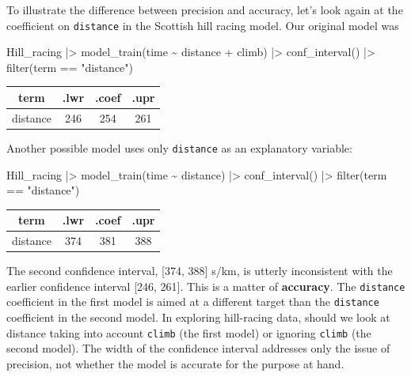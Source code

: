 \documentclass[
  letterpaper,
  DIV=11,
  numbers=noendperiod,
  oneside]{scrartcl}
\newenvironment{Shaded}{\begin{snugshade}}{\end{snugshade}}
\newcommand{\FunctionTok}[1]{\textcolor[rgb]{0.28,0.35,0.67}{#1}}
\newcommand{\NormalTok}[1]{\textcolor[rgb]{0.00,0.23,0.31}{#1}}
\newcommand{\SpecialCharTok}[1]{\textcolor[rgb]{0.37,0.37,0.37}{#1}}
\newcommand{\StringTok}[1]{\textcolor[rgb]{0.13,0.47,0.30}{#1}}
\begin{document}
To illustrate the difference between precision and accuracy, let's look
again at the coefficient on \texttt{distance} in the Scottish hill
racing model. Our original model was

\begin{Shaded}
\begin{Highlighting}[]
\NormalTok{Hill\_racing }\SpecialCharTok{|\textgreater{}} 
  \FunctionTok{model\_train}\NormalTok{(time }\SpecialCharTok{\textasciitilde{}}\NormalTok{ distance }\SpecialCharTok{+}\NormalTok{ climb) }\SpecialCharTok{|\textgreater{}} 
  \FunctionTok{conf\_interval}\NormalTok{() }\SpecialCharTok{|\textgreater{}}
  \FunctionTok{filter}\NormalTok{(term }\SpecialCharTok{==} \StringTok{"distance"}\NormalTok{)}
\end{Highlighting}
\end{Shaded}

\begin{longtable}[]{@{}cccc@{}}
\toprule\noalign{}
term & .lwr & .coef & .upr \\
\midrule\noalign{}
\endhead
\bottomrule\noalign{}
\endlastfoot
distance & 246 & 254 & 261 \\
\end{longtable}

Another possible model uses only \texttt{distance} as an explanatory
variable:

\begin{Shaded}
\begin{Highlighting}[]
\NormalTok{Hill\_racing }\SpecialCharTok{|\textgreater{}} 
  \FunctionTok{model\_train}\NormalTok{(time }\SpecialCharTok{\textasciitilde{}}\NormalTok{ distance) }\SpecialCharTok{|\textgreater{}} 
  \FunctionTok{conf\_interval}\NormalTok{() }\SpecialCharTok{|\textgreater{}}
  \FunctionTok{filter}\NormalTok{(term }\SpecialCharTok{==} \StringTok{"distance"}\NormalTok{)}
\end{Highlighting}
\end{Shaded}

\begin{longtable}[]{@{}cccc@{}}
\toprule\noalign{}
term & .lwr & .coef & .upr \\
\midrule\noalign{}
\endhead
\bottomrule\noalign{}
\endlastfoot
distance & 374 & 381 & 388 \\
\end{longtable}

The second confidence interval, {[}374, 388{]} s/km, is utterly
inconsistent with the earlier confidence interval {[}246, 261{]}. This
is a matter of \textbf{accuracy}. The \texttt{distance} coefficient in
the first model is aimed at a different target than the
\texttt{distance} coefficient in the second model. In exploring
hill-racing data, should we look at distance taking into account
\texttt{climb} (the first model) or ignoring \texttt{climb} (the second
model). The width of the confidence interval addresses only the issue of
precision, not whether the model is accurate for the purpose at hand.
\end{document}

